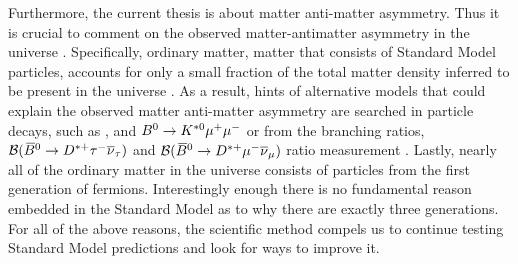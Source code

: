 Furthermore, the current thesis is about matter anti-matter asymmetry. Thus it is crucial to comment on
the observed matter-antimatter asymmetry in the universe \cite{more-cpv-huet,more-cpv-gavela_I,more-cpv-gavela_II}.
Specifically, ordinary matter, \ie matter that consists of Standard Model particles, accounts for only a small
fraction of the total matter density inferred to be present in the universe \cite{dmatter-Hinshaw}.
As a result, hints of alternative models that could explain the observed matter anti-matter asymmetry are
searched in particle decays, such as \Bsmm, \Bdmm \cite{CMS:2014xfa} and $B^0 \rightarrow K^{*0} \mu^+\mu^-$\cite{Aaij:2015oid}
or from the branching ratios, ${\cal B}(\kern 0.18em\overline{\kern -0.18em B}{}^0 \rightarrow D^{*+} \tau^-\overline{\nu}_\tau)$ and ${\cal B}(\kern 0.18em\overline{\kern -0.18em B}{}^0 \rightarrow D^{*+} \mu^-\overline{\nu}_\mu)$ ratio measurement \cite{Aaij:2015yra}.
Lastly, nearly all of the ordinary matter in the universe consists of particles from the first generation
of fermions. Interestingly enough there is no fundamental reason embedded in the Standard Model
as to why there are exactly three generations. For all of the above reasons, the scientific method compels
us to continue testing Standard Model predictions and look for ways to improve it.
